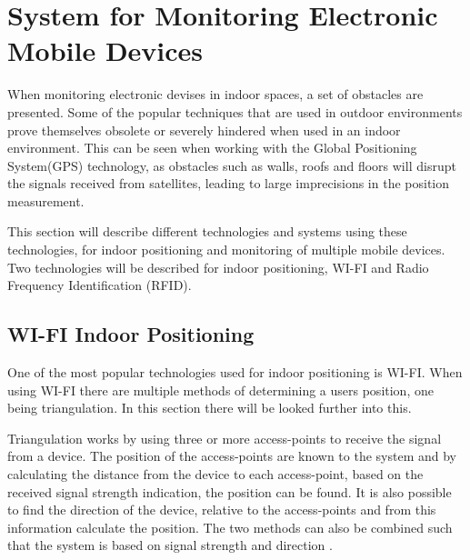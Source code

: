 \section{System for Monitoring Electronic Mobile Devices}\label{sec:monitoring}
When monitoring electronic devises in indoor spaces, a set of obstacles are presented. Some of the popular techniques that are used in outdoor environments prove themselves obsolete or severely hindered when used in an indoor environment.  This can be seen when working with the Global Positioning System(GPS) technology, as obstacles such as walls, roofs and floors will disrupt the signals received from satellites, leading to large imprecisions in the position measurement.

This section will describe different technologies and systems using these technologies, for indoor positioning and monitoring of multiple mobile devices. Two technologies will be described for indoor positioning, WI-FI and Radio Frequency Identification (RFID).  

\subsection{WI-FI Indoor Positioning}
One of the most popular technologies used for indoor positioning is WI-FI. When using WI-FI there are multiple methods of determining a users position, one being triangulation. In this section there will be looked further into this. 


Triangulation works by using three or more access-points to receive the signal from a device. The position of the access-points are known to the system and by calculating the distance from the device to each access-point, based on the received signal strength indication, the position can be found. It is also possible to find the direction of the device, relative to the access-points and from this information calculate the position. The two methods can also be combined such that the system is based on signal strength and direction \cite{Triangulation}.

